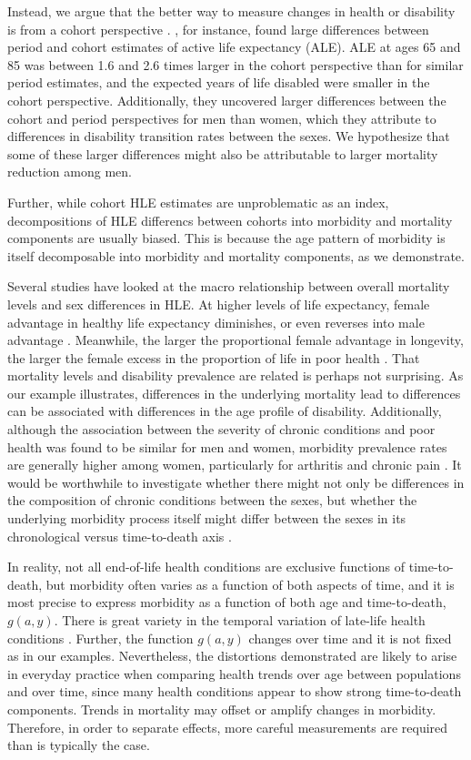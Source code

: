 \documentclass[11pt,oneside,a4paper]{article} %
\begin{document}
Instead, we argue that the better way to measure changes in health or disability
is from a cohort perspective \citep{Manton2000,Manton2008,Christensen2013}.
\citet{Manton2000}, for instance, found large differences between period and
cohort estimates of active life expectancy (ALE). ALE at ages 65 and 85 was
between 1.6 and 2.6 times larger in the cohort perspective than for similar
period estimates, and the expected years of life disabled were smaller in the
cohort perspective.
Additionally, they uncovered larger differences between the cohort and period
perspectives for men than women, which they attribute to differences in
disability transition rates between the sexes. We hypothesize that some of these
larger differences might also be attributable to larger mortality reduction
among men. 

Further, while cohort HLE estimates are unproblematic as an index,
decompositions of HLE differencs between cohorts into morbidity and
mortality components are usually biased. This is because the age pattern of
morbidity is itself decomposable into morbidity and
mortality components, as we demonstrate.

Several studies have looked at the macro relationship between overall mortality
levels and sex differences in HLE. At higher levels of life expectancy, female
advantage in healthy life expectancy diminishes, or even reverses into male
advantage \citep{vanOyen2013}. Meanwhile, the larger the proportional female
advantage in longevity, the larger the female excess in the proportion of life
in poor health \citep{Luy2014}. That mortality levels and disability prevalence
are related is perhaps not surprising. As our example illustrates, differences
in the underlying mortality lead to differences can be associated with
differences in the age profile of disability. Additionally, although the
association between the severity of chronic conditions and poor health was found
to be similar for men and women, morbidity prevalence rates are generally higher
among women, particularly for arthritis and chronic pain \citep{Case2005}. It
would be worthwhile to investigate whether there might not only be differences
in the composition of chronic conditions between the sexes, but whether the
underlying morbidity process itself might differ between the sexes in its
chronological versus time-to-death axis \citep{riffe2015ttd}.

In reality, not all end-of-life health conditions are exclusive functions of
time-to-death, but morbidity often varies as a function of
both aspects of time, and it is most precise to express morbidity
as a function of both age and time-to-death, $g(a,y)$. There is great variety in
the temporal variation of late-life health conditions \citep{riffe2015ttd,
lunney2003patterns}.
Further, the function $g(a,y)$ changes over time and it is not fixed as in our examples. Nevertheless, the distortions demonstrated are likely to arise in everyday practice when comparing health trends over age between populations
and over time, since many health conditions appear to show strong time-to-death
components. Trends in mortality may offset or amplify changes in morbidity.
Therefore, in order to separate effects, more careful measurements are required
than is typically the case. 
\end{document}
